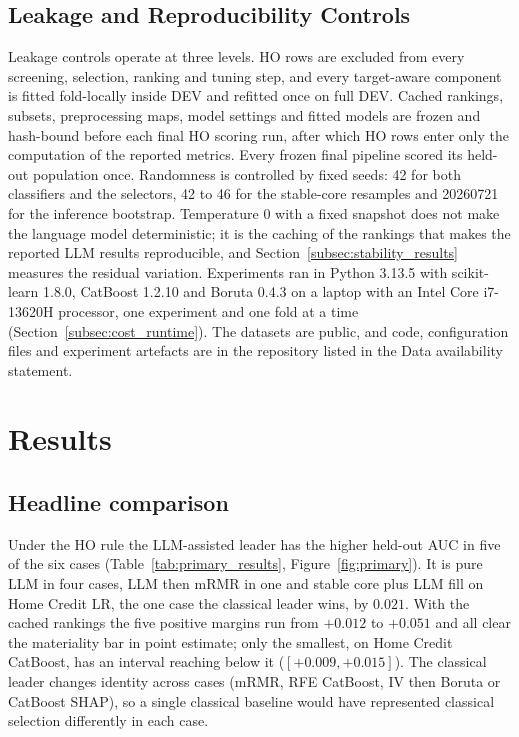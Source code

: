 \documentclass[final,5p,twocolumn]{elsarticle}
\begin{document}
\subsection{Leakage and Reproducibility Controls}
\label{subsec:leakage_controls}

Leakage controls operate at three levels. HO rows are excluded from every screening, selection, ranking and tuning step, and every target-aware component is fitted fold-locally inside DEV and refitted once on full DEV. Cached rankings, subsets, preprocessing maps, model settings and fitted models are frozen and hash-bound before each final HO scoring run, after which HO rows enter only the computation of the reported metrics. Every frozen final pipeline scored its held-out population once. Randomness is controlled by fixed seeds: 42 for both classifiers and the selectors, 42 to 46 for the stable-core resamples and 20260721 for the inference bootstrap. Temperature 0 with a fixed snapshot does not make the language model deterministic; it is the caching of the rankings that makes the reported LLM results reproducible, and Section~\ref{subsec:stability_results} measures the residual variation. Experiments ran in Python 3.13.5 with scikit-learn 1.8.0, CatBoost 1.2.10 and Boruta 0.4.3 on a laptop with an Intel Core i7-13620H processor, one experiment and one fold at a time (Section~\ref{subsec:cost_runtime}). The datasets are public, and code, configuration files and experiment artefacts are in the repository listed in the Data availability statement.


\section{Results}
\label{sec:results}

\subsection{Headline comparison}
\label{subsec:primary_results}

Under the HO rule the LLM-assisted leader has the higher held-out AUC in five of the six cases (Table~\ref{tab:primary_results}, Figure~\ref{fig:primary}). It is pure LLM in four cases, LLM then mRMR in one and stable core plus LLM fill on Home Credit LR, the one case the classical leader wins, by $0.021$. With the cached rankings the five positive margins run from $+0.012$ to $+0.051$ and all clear the materiality bar in point estimate; only the smallest, on Home Credit CatBoost, has an interval reaching below it ($[+0.009, +0.015]$). The classical leader changes identity across cases (mRMR, RFE CatBoost, IV then Boruta or CatBoost SHAP), so a single classical baseline would have represented classical selection differently in each case.
\end{document}
